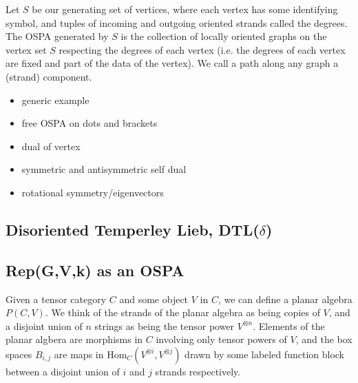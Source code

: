 \documentclass[11pt]{article} %
\begin{document}
\begin{mydef}
Let $S$ be our generating set of vertices, where each vertex has some identifying symbol, and tuples of incoming and outgoing oriented strands called the degrees. The OSPA generated by $S$ is the collection of locally oriented graphs on the vertex set $S$ respecting the degrees of each vertex (i.e. the degrees of each vertex are fixed and part of the data of the vertex). We call a path along any graph a (strand) component. 

\end{mydef}

\begin{itemize}
\item generic example
\item free OSPA on dots and brackets
\item dual of vertex
\item symmetric and antisymmetric self dual
\item rotational symmetry/eigenvectors
\end{itemize}



\subsection{Disoriented Temperley Lieb, DTL($\delta$)}



\subsection{Rep(G,V,k) as an OSPA}

Given a tensor category $C$ and some object $V$ in $C$, we can define a planar algebra $P(C,V)$. We think of the strands of the planar algebra as being copies of $V$, and a disjoint union of $n$ strings as being the tensor power $V^{\otimes n}$. Elements of the planar algbera are morphisms in $C$ involving only tensor powers of $V$, and the box spaces $B_{i,j}$ are maps in $\text{Hom}_C(V^{\otimes i}, V^{\otimes j})$ drawn by some labeled function block between a disjoint union of $i$ and $j$ strands respectively.
\end{document}
